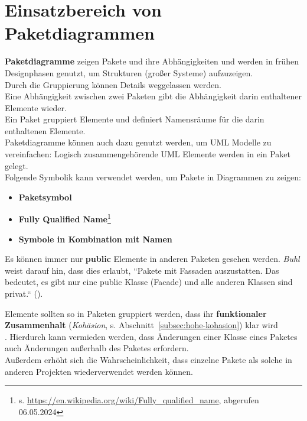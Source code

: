 \section{Einsatzbereich von Paketdiagrammen}

\textbf{Paketdiagramme} zeigen Pakete und ihre Abhängigkeiten und werden in frühen Designphasen genutzt, um Strukturen (großer Systeme) aufzuzeigen.\\
Durch die Gruppierung können Details weggelassen werden.\\

\noindent
Eine Abhängigkeit zwischen zwei Paketen gibt die Abhängigkeit darin enthaltener Elemente wieder.\\

\noindent
Ein Paket gruppiert Elemente und definiert Namensräume für die darin enthaltenen Elemente.\\

\noindent
Paketdiagramme können auch dazu genutzt werden, um UML Modelle zu vereinfachen: Logisch zusammengehörende UML Elemente werden in ein Paket gelegt.\\

\noindent
Folgende Symbolik kann verwendet werden, um Pakete in Diagrammen zu zeigen:

\begin{itemize}
    \item \textbf{Paketsymbol}
    \item \textbf{Fully Qualified Name}\footnote{
    s. \url{https://en.wikipedia.org/wiki/Fully_qualified_name}, abgerufen 06.05.2024
    }
    \item \textbf{Symbole in Kombination mit Namen}
\end{itemize}

\noindent
Es können immer nur \textbf{public} Elemente in anderen Paketen gesehen werden.
\textit{Buhl} weist darauf hin, dass dies erlaubt, ``Pakete mit Fassaden auszustatten. Das bedeutet, es gibt nur eine public Klasse (Facade) und alle anderen Klassen sind privat.`` (\cite[46]{Buh09}).\\

\begin{tcolorbox}
    Elemente sollten so in Paketen gruppiert werden, dass ihr \textbf{funktionaler Zusammenhalt} (\textit{Kohäsion}, s. Abschnitt~\ref{subsec:hohe-kohasion}) klar wird\\.
    Hierdurch kann vermieden werden, dass Änderungen einer Klasse eines Paketes auch Änderungen außerhalb des Paketes erfordern.\\
    Außerdem erhöht sich die Wahrscheinlichkeit, dass einzelne Pakete als solche in anderen Projekten wiederverwendet werden können.
\end{tcolorbox}
